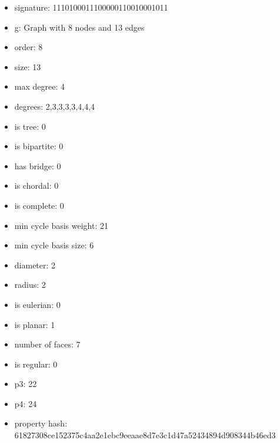 \begin{itemize}
\item signature: 1110100011100000110010001011
\item g: Graph with 8 nodes and 13 edges
\item order: 8
\item size: 13
\item max degree: 4
\item degrees: 2,3,3,3,3,4,4,4
\item is tree: 0
\item is bipartite: 0
\item has bridge: 0
\item is chordal: 0
\item is complete: 0
\item min cycle basis weight: 21
\item min cycle basis size: 6
\item diameter: 2
\item radius: 2
\item is eulerian: 0
\item is planar: 1
\item number of faces: 7
\item is regular: 0
\item p3: 22
\item p4: 24
\item property hash: 61827308ce152375c4aa2e1ebc9eeaae8d7e3c1d47a52434894d908344b46ed3
\end{itemize}
\newpage
\begin{figure}
\end{figure}
